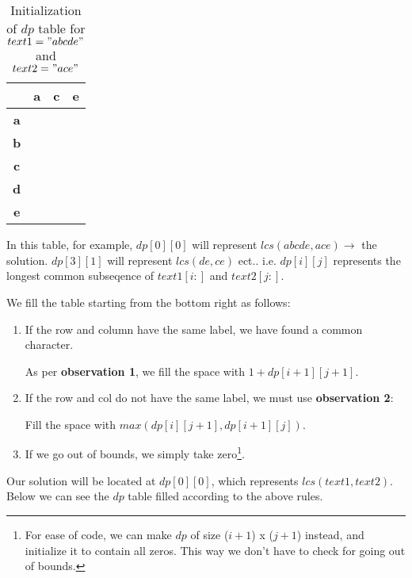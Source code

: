 \begin{table}[htbp]
    \centering
    \begin{tabular}{|c|c|c|c|}
        \hline
          & \textbf{a} & \textbf{c} & \textbf{e} \\
        \hline
        \textbf{a} &   &   &   \\
        \hline
        \textbf{b} &   &   &    \\
        \hline
        \textbf{c} &   &   &    \\
        \hline
        \textbf{d} &   &   &   \\
        \hline
        \textbf{e} &   &   &    \\
        \hline
    \end{tabular}
    \caption{Initialization of $dp$ table for $text1="abcde"$ and $text2="ace"$}
\end{table}

In this table, for example,
$dp[0][0]$ will represent $lcs(abcde,ace) \rightarrow$  the solution.
$dp[3][1]$ will represent $lcs(de,ce)$ ect..
i.e. $dp[i][j]$ represents the longest common subseqence of $text1[i:]$ and $text2[j:]$.

We fill the table starting from the bottom right as follows:
\newpage
\begin{enumerate}
    \item If the row and column have the same label, we have found a common character.

    As per \textbf{observation 1}, we fill the space with $1 + dp[i+1][j+1]$.
    
    \item If the row and col do not have the same label, we must use \textbf{observation 2}:

    Fill the space with $max(dp[i][j+1], dp[i+1][j])$.
    
    \item If we go out of bounds, we simply take zero\footnote{For ease of code, we can make $dp$ of size ($i+1$) x ($j+1$) instead, and initialize it to contain all zeros. This way we don't have to check for going out of bounds.}.
\end{enumerate}

Our solution will be located at $dp[0][0]$, which represents $lcs(text1,text2)$. Below we can see the $dp$ table filled according to the above rules.

